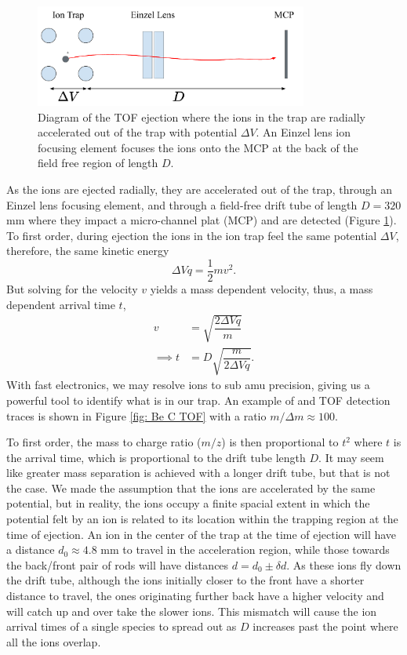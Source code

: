 \begin{figure}
	\centering
	\includegraphics[width=0.8\textwidth]{images/TOF_diagram.pdf}
	\caption{Diagram of the TOF ejection where the ions in the trap are radially accelerated out of the trap with potential $\Delta V$. An Einzel lens ion focusing element focuses the ions onto the MCP at the back of the field free region of length $D$.}
	\label{fig: TOF diagram}
\end{figure}

As the ions are ejected radially, they are accelerated out of the trap, through an Einzel lens focusing element, and through a field-free drift tube of length $D=320$ mm where they impact a micro-channel plat (MCP) and are detected (Figure \ref{fig: TOF diagram}). To first order, during ejection the ions in the ion trap feel the same potential $\Delta V$, therefore, the same kinetic energy
\begin{equation*}
	\Delta V q = \frac{1}{2} m v^2.
\end{equation*}
But solving for the velocity $v$ yields a mass dependent velocity, thus, a mass dependent arrival time $t$,
\begin{align*}
	v & = \sqrt{\dfrac{2 \Delta V q}{m}} \\
	\implies t & = D \sqrt{\dfrac{m}{2 \Delta V q}}.
\end{align*}
With fast electronics, we may resolve ions to sub amu precision, giving us a powerful tool to identify what is in our trap. An example of  and  TOF detection traces is shown in Figure \ref{fig: Be C TOF} with a ratio $m/\Delta m \approx 100$.

To first order, the mass to charge ratio ($m/z$) is then proportional to $t^2$ where $t$ is the arrival time, which is proportional to the drift tube length $D$. It may seem like greater mass separation is achieved with a longer drift tube, but that is not the case. We made the assumption that the ions are accelerated by the same potential, but in reality, the ions occupy a finite spacial extent in which the potential felt by an ion is related to its location within the trapping region at the time of ejection. An ion in the center of the trap at the time of ejection will have a distance $d_0\approx 4.8$ mm to travel in the acceleration region, while those towards the back/front pair of rods will have distances $d=d_0\pm \delta d$. As these ions fly down the drift tube, although the ions initially closer to the front have a shorter distance to travel, the ones originating further back have a higher velocity and will catch up and over take the slower ions. This mismatch will cause the ion arrival times of a single species to spread out as $D$ increases past the point where all the ions overlap.

